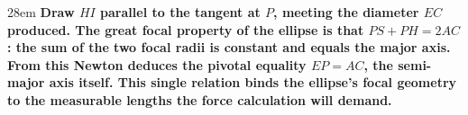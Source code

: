 \documentclass[border=4pt]{standalone}
\begin{document}
\begin{varwidth}{28em}
\large\bfseries
Draw $HI$ parallel to the tangent at $P$, meeting the diameter $EC$ produced.      The great focal property of the \textcolor{ellblue}{ellipse} is that $PS+PH=2AC$: the sum      of the two \textcolor{radgreen}{focal radii} is constant and equals the major axis. From      this Newton deduces the pivotal equality \textcolor{equalpurple}{$EP = AC$}, the semi-major      axis itself. This single relation binds the ellipse's focal geometry to the      measurable lengths the force calculation will demand.
\end{varwidth}
\end{document}
